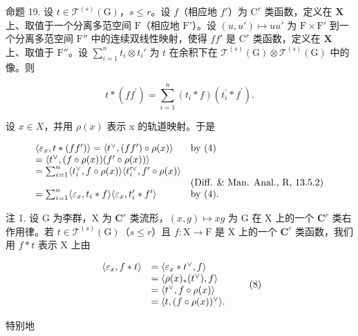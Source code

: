 命题 19. 设 \(t \in \mathcal{T}^{(s)}(\mathrm{G})\)，\(s \leqslant r\)。设 \(f\)（相应地 \(f'\)）为 \(\mathrm{C}^r\) 类函数，定义在 \(\mathbf{X}\) 上、取值于一个分离多范空间 \(\mathrm{F}\)（相应地 \(\mathrm{F}'\)）。设 \((u, u') \mapsto uu'\) 为 \(\mathrm{F} \times \mathrm{F}'\) 到一个分离多范空间 \(\mathrm{F}''\) 中的连续双线性映射，使得 \(ff'\) 是 \(\mathrm{C}^r\) 类函数，定义在 \(\mathbf{X}\) 上、取值于 \(\mathrm{F}''\)。设 \(\sum_{i=1}^{n} t_i \otimes t_i'\) 为 \(t\) 在余积下在 \(\mathcal{T}^{(s)}(\mathrm{G}) \otimes \mathcal{T}^{(s)}(\mathrm{G})\) 中的像。则

\[
t * (f f ^ {\prime}) = \sum_ {i = 1} ^ {n} (t _ {i} * f) (t _ {i} ^ {\prime} * f ^ {\prime}).
\]

设 \(x \in X\)，并用 \(\rho(x)\) 表示 x 的轨道映射。于是

\[
\begin{array}{l l} \langle \varepsilon_ {x}, t * (f f ^ {\prime}) \rangle = \langle t ^ {\vee}, (f f ^ {\prime}) \circ \rho (x) \rangle & \text {by (4)} \\ = \langle t ^ {\vee}, (f \circ \rho (x)) (f ^ {\prime} \circ \rho (x)) \rangle \\ = \sum_ {i = 1} ^ {n} \langle t _ {i} ^ {\vee}, f \circ \rho (x) \rangle \langle t _ {i} ^ {\prime \vee}, f ^ {\prime} \circ \rho (x) \rangle \\ & (\text {Diff. \& Man. Anal., R, 13.5.2}) \\ = \sum_ {i = 1} ^ {n} \langle \varepsilon_ {x}, t _ {i} * f \rangle \langle \varepsilon_ {x}, t _ {i} ^ {\prime} * f ^ {\prime} \rangle & \text {by (4).} \end{array}
\]

注 1. 设 G 为李群，X 为 \(\mathbf{C}^r\) 类流形，\((x,g)\mapsto xg\) 为 G 在 X 上的一个 \(\mathbf{C}^r\) 类右作用律。若 \(t\in \mathcal{T}^{(s)}(\mathrm{G})\)（\(s\leqslant r\)）且 \(f\colon \mathrm{X}\to \mathrm{F}\) 是 X 上的一个 \(\mathbf{C}^r\) 类函数，我们用 \(f*t\) 表示 X 上由

\[
\begin{array}{r l} \langle \varepsilon_ {x}, f * t \rangle & = \langle \varepsilon_ {x} * t ^ {\vee}, f \rangle \\ & = \langle \rho (x) _ {*} (t ^ {\vee}), f \rangle \\ & = \langle t ^ {\vee}, f \circ \rho (x) \rangle \\ & = \langle t, (f \circ \rho (x)) ^ {\vee} \rangle . \end{array}\tag{8}
\]

特别地

